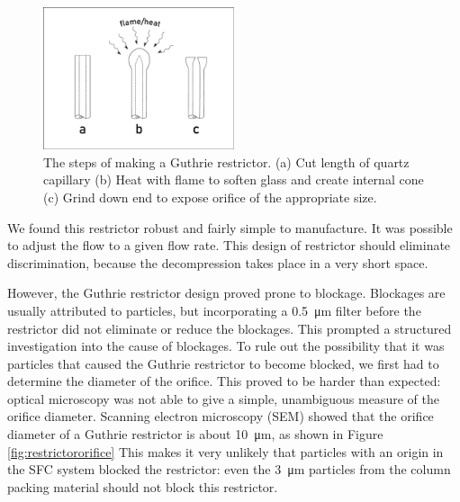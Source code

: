 \begin{figure}
\centering
\includegraphics[width=0.5\textwidth]{Figures/Restrictor.pdf}
\decoRule

\caption[A diagram of a integral restrictor.]{The steps of making a Guthrie restrictor. (a) Cut
length of quartz capillary (b) Heat with flame to soften glass and create
internal cone (c) Grind down end to expose orifice of the appropriate size.}

\label{fig:restrictor}
\end{figure}

We found this restrictor robust and fairly simple to manufacture. It was
possible to adjust the flow to a given flow rate. This design of restrictor
should eliminate discrimination, because the decompression takes place in a very
short space.

However, the Guthrie restrictor design proved prone to blockage. Blockages are
usually attributed to particles, but incorporating a \SI{0.5}{\micro\metre}
filter before the restrictor did not eliminate or reduce the blockages.
This prompted a structured investigation into the cause of blockages. To rule
out the possibility that it was particles that caused the Guthrie restrictor to
become blocked, we first had to determine the diameter of the orifice. This
proved to be harder than expected: optical microscopy was not able to give a
simple, unambiguous measure of the orifice diameter. Scanning electron
microscopy (SEM) showed that the orifice diameter of a Guthrie restrictor is
about \SI{10}{\micro\meter}, as shown in Figure \ref{fig:restrictororifice} This
makes it very unlikely that particles with an origin in the SFC system blocked
the restrictor: even the \SI{3}{\micro\meter} particles from the column packing
material should not block this restrictor.

